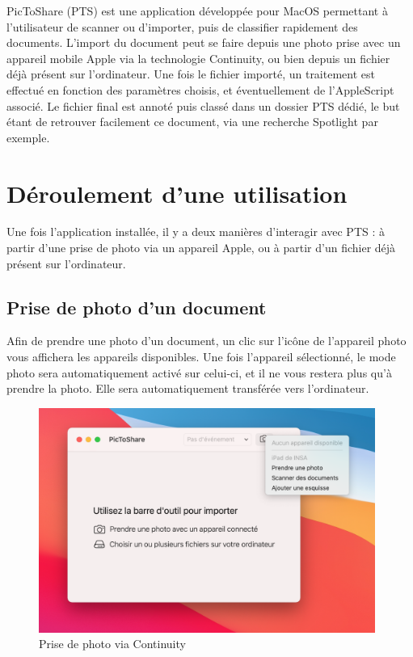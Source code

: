 \documentclass[a4paper,11pt]{article}
\begin{document}
	PicToShare (PTS) est une application développée pour MacOS permettant à l'utilisateur de scanner ou d'importer, puis de classifier rapidement des documents. L'import du document peut se faire depuis une photo prise avec un appareil mobile Apple via la technologie Continuity, ou bien depuis un fichier déjà présent sur l'ordinateur. Une fois le fichier importé, un traitement est effectué en fonction des paramètres choisis, et éventuellement de l'AppleScript associé. Le fichier final est annoté puis classé dans un dossier PTS dédié, le but étant de retrouver facilement ce document, via une recherche Spotlight par exemple.
	
	
	\section{Déroulement d'une utilisation}
	
	Une fois l'application installée, il y a deux manières d'interagir avec PTS : à partir d'une prise de photo via un appareil Apple, ou à partir d'un fichier déjà présent sur l'ordinateur.
	
	\subsection{Prise de photo d'un document}
	
	Afin de prendre une photo d'un document, un clic sur l'icône de l'appareil photo vous affichera les appareils disponibles. Une fois l'appareil sélectionné, le mode photo sera automatiquement activé sur celui-ci, et il ne vous restera plus qu'à prendre la photo. Elle sera automatiquement transférée vers l'ordinateur.
		\begin{figure}[h!]
			\centering
			\includegraphics[width=11cm]{Continuity}
			\caption{Prise de photo via Continuity} 
		\end{figure}
	
\end{document}
